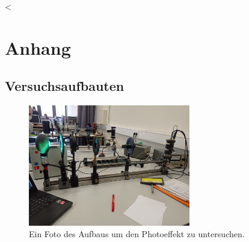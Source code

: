 <\newpage
\section{Anhang}

\subsection{Versuchsaufbauten}
\begin{figure}[H]
    \centering
    \includegraphics[width=0.63\textwidth]{latex/images/Aufbau_Photoeffekt.jpeg}
    \caption{Ein Foto des Aufbaus um den Photoeffekt zu untersuchen.}
    \label{img:aufbau}
\end{figure}